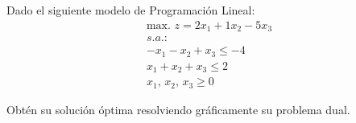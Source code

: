 Dado el siguiente modelo de Programación Lineal:
\begin{equation}
\begin{split}
\mbox{max. } z = 2x_1 + 1x_2 -5 x_3\\
s.a.:\\
-x_1 -x_2 + x_3 \leq -4\\
x_1 +  x_2 +  x_3 \leq 2\\
x_1,\,x_2,\,x_3 \geq 0
\end{split} 
\end{equation}

Obtén su solución óptima resolviendo gráficamente su problema dual.